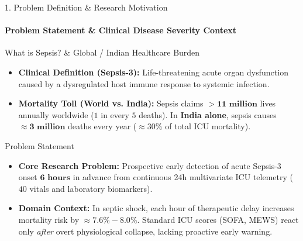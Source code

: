 \documentclass[aspectratio=169, 11pt]{beamer}
\begin{document}
\begin{frame}{1. Problem Definition \& Research Motivation}
    \framesubtitle{Problem Statement \& Clinical Disease Severity Context}
    \begin{block}{What is Sepsis? \& Global / Indian Healthcare Burden}
        \footnotesize
        \begin{itemize}
            \item \textbf{Clinical Definition (Sepsis-3):} Life-threatening acute organ dysfunction caused by a dysregulated host immune response to systemic infection.
            \item \textbf{Mortality Toll (World vs. India):} Sepsis claims $> \mathbf{11\text{ million}}$ lives annually worldwide ($1$ in every $5$ deaths). In \textbf{India alone}, sepsis causes $\approx \mathbf{3\text{ million}}$ deaths every year ($\approx 30\%$ of total ICU mortality).
        \end{itemize}
    \end{block}
    \vspace{-0.10cm}

    \begin{block}{Problem Statement}
        \footnotesize
        \begin{itemize}
            \item \textbf{Core Research Problem:} Prospective early detection of acute Sepsis-3 onset $\mathbf{6\text{ hours}}$ in advance from continuous 24h multivariate ICU telemetry ($40$ vitals and laboratory biomarkers).
            \item \textbf{Domain Context:} In septic shock, each hour of therapeutic delay increases mortality risk by $\approx \mathbf{7.6\% - 8.0\%}$. Standard ICU scores (SOFA, MEWS) react only \textit{after} overt physiological collapse, lacking proactive early warning.
        \end{itemize}
    \end{block}
\end{frame}
\end{document}

